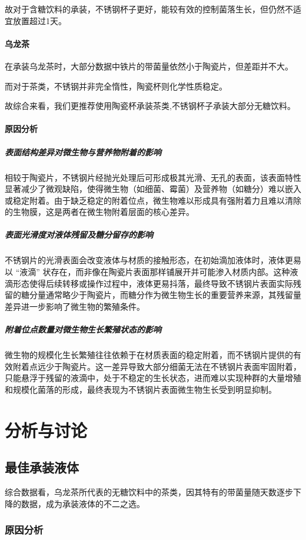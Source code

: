 \documentclass[12pt,a4paper]{ctexart}
\begin{document}
故对于含糖饮料的承装，不锈钢杯子更好，能较有效的控制菌落生长，但仍然不适宜放置超过1天。

\paragraph{乌龙茶}
在承装乌龙茶时，大部分数据中铁片的带菌量依然小于陶瓷片，但差距并不大。

而对于茶类，不锈钢并非完全惰性，陶瓷杯则化学性质稳定。

故综合来看，我们更推荐使用陶瓷杯承装茶类,不锈钢杯子承装大部分无糖饮料。

\paragraph{原因分析}
\subparagraph{表面结构差异对微生物与营养物附着的影响}
相较于陶瓷片，不锈钢片经抛光处理后可形成极其光滑、无孔的表面，该表面特性显著减少了微观缺陷，使得微生物（如细菌、霉菌）及营养物（如糖分）难以嵌入或稳定附着。由于缺乏稳定的附着位点，微生物难以形成具有强附着力且难以清除的生物膜，这是两者在微生物附着层面的核心差异。
\subparagraph{表面光滑度对液体残留及糖分留存的影响}
不锈钢片的光滑表面会改变液体与材质的接触形态，在初始滴加液体时，液体更易以 “液滴” 状存在，而非像在陶瓷片表面那样铺展开并可能渗入材质内部。这种液滴形态使得后续转移或操作过程中，液体更易抖落，最终导致不锈钢片表面实际残留的糖分量通常略少于陶瓷片，而糖分作为微生物生长的重要营养来源，其残留量差异进一步影响了微生物的繁殖条件。
\subparagraph{附着位点数量对微生物生长繁殖状态的影响}
微生物的规模化生长繁殖往往依赖于在材质表面的稳定附着，而不锈钢片提供的有效附着点远少于陶瓷片。这一差异导致大部分细菌无法在不锈钢片表面牢固附着，只能悬浮于残留的液滴中，处于不稳定的生长状态，进而难以实现种群的大量增殖和规模化菌落的形成，最终表现为不锈钢片表面微生物生长受到明显抑制。

\section{分析与讨论}
\subsection{最佳承装液体}
综合数据看，乌龙茶所代表的无糖饮料中的茶类，因其特有的带菌量随天数逐步下降的数据，成为承装液体的不二之选。

\subsubsection{原因分析}
\end{document}
